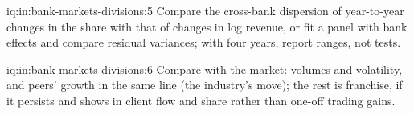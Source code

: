 \begin{solution}{iq:in:bank-markets-divisions:5}
Compare the cross-bank dispersion of year-to-year changes in the share with that of changes in log revenue, or fit a
panel with bank effects and compare residual variances; with four years, report ranges, not tests.
\end{solution}

\begin{solution}{iq:in:bank-markets-divisions:6}
Compare with the market: volumes and volatility, and peers' growth in the same line (the industry's move); the rest is
franchise, if it persists and shows in client flow and share rather than one-off trading gains.
\end{solution}
